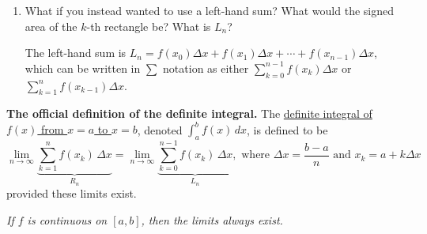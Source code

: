 \documentclass[main]{subfiles}
\begin{document}
\begin{enumerate}
{\begin{enumerate}
      \begin{problem}[36pt]
        What is $R_n$?
      \end{problem}

      \begin{solution}
        $f(x_1) \Delta x+ f(x_2) \Delta x+ f(x_3) \Delta x+ ... +
        f(x_{n-1}) \Delta x+ f(x_n) \Delta x$, which can be written in
        $\sum$ notation as $\displaystyle \sum_{k=1}^n f(x_{k}) \Delta x$
      \end{solution}

    \item


      \begin{problem}[\vfill]
        What if you instead wanted to use a left-hand sum?  What would the
        signed area of the $k$-th rectangle be?  What is $L_n$?
      \end{problem}

      \begin{solution}
        The left-hand sum is $L_n = f(x_0) \Delta x + f(x_1) \Delta x +
        \cdots + f(x_{n-1}) \Delta x$, which can be written in $\sum$
        notation as either $\displaystyle \sum_{k=0}^{n-1} f(x_k) \Delta
        x$ or $\displaystyle \sum_{k=1}^n f(x_{k-1}) \Delta x$. 
      \end{solution}

    \end{enumerate}
  }

\end{enumerate}
\begin{problemonly}
  \begin{framed}
    \textbf{The official definition of the definite integral.}  The
    \uline{definite integral of $f(x)$ from $x = a$ to $x = b$}, denoted
    $\displaystyle \int_a^b f(x)\,dx$, is defined to be
    \[ \lim_{n \to \infty} \underbrace{\sum_{k=1}^n f(x_k)\, \Delta x}_{R_n}
    = \lim_{n \to \infty} \underbrace{\sum_{k=0}^{n-1} f(x_k)\, \Delta
      x}_{L_n}, \text{ where } \Delta x = \frac{b - a}{n} \text{ and } x_k
    = a + k \Delta x\] provided these limits exist.

    \textit{If $f$ is continuous on $[a, b]$, then the limits always
      exist.}
  \end{framed}
\end{problemonly}
\end{document}
